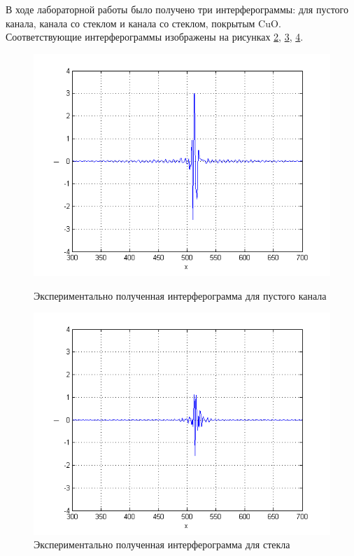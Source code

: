\documentclass[a4paper,12pt]{article} %
\begin{document}
    В ходе лабораторной работы было получено три интерферограммы: 
    для пустого канала, канала со стеклом и канала со стеклом, покрытым CuO. 
    Соответствующие интерферограммы изображены на рисунках \hyperref[picture_2]{2}, \hyperref[picture_3]{3}, \hyperref[picture_4]{4}.

    \begin{figure}[h!]
        \begin{center}
            \begin{minipage}[h!]{0.48\linewidth}
                \includegraphics[width=1\linewidth]{2.png}
                \caption{Экспериментально полученная интерферограмма для пустого канала}
                \label{picture_2}
            \end{minipage}
            \hfill
            \begin{minipage}[h!]{0.48\linewidth}
                \includegraphics[width=1\linewidth]{3.png}
                \caption{Экспериментально полученная интерферограмма для стекла}
                \label{picture_3}
            \end{minipage}
        \end{center}
    \end{figure}
\end{document}
